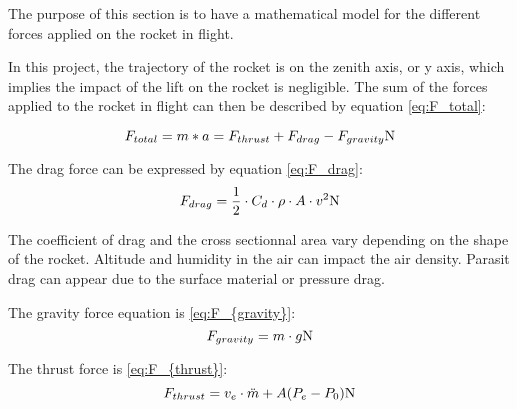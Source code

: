 The purpose of this section is to have a mathematical model for the different forces applied on the rocket in flight. 

In this project, the trajectory of the rocket is on the zenith axis, or y axis, which implies the impact of the lift on the rocket is negligible. The sum of the forces applied to the rocket in flight can then be described by equation \eqref{eq:F_total}:

\begin{equation}
F_{total} = m*a = F_{thrust} + F_{drag} - F_{gravity} \si{\newton} \label{eq:F_{total}}
\end{equation}
\startexplain
{}
\stopexplain

The drag force can be expressed by equation \eqref{eq:F_drag}:
\begin{equation}
F_{drag} = \frac{1}{2} \cdot C_{d} \cdot \rho \cdot A \cdot v^2 \si{\newton} \label{eq:F_{drag}}
\end{equation}
\startexplain
{}
\stopexplain
	
The coefficient of drag and the cross sectionnal area vary depending on the shape of the rocket. Altitude and humidity in the air can impact the air density. Parasit drag can appear due to the surface material or pressure drag.

The gravity force equation is \eqref{eq:F_{gravity}}:
\begin{equation}
F_{gravity} = m \cdot g \si{\newton} \label{eq:F_{gravity}}
\end{equation}
\startexplain
{}
\stopexplain
	

The thrust force is \eqref{eq:F_{thrust}}:
\begin{equation}
F_{thrust} = v_{e} \cdot \ddot{m} + A (P_{e} -P_{0}) \si{\newton} \label{eq:F_{thrust}}
\end{equation}
\startexplain
{}
\stopexplain


